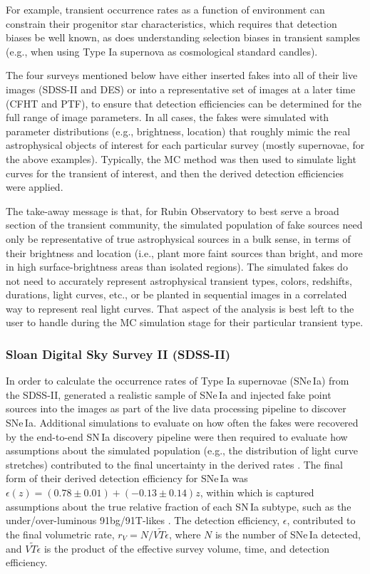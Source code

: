 For example, transient occurrence rates as a function of environment can constrain their progenitor star characteristics, which requires that detection biases be well known, as does understanding selection biases in transient samples (e.g., when using Type Ia supernova as cosmological standard candles). 

The four surveys mentioned below have either inserted fakes into all of their live images (SDSS-II and DES) or into a representative set of images at a later time (CFHT and PTF), to ensure that detection efficiencies can be determined for the full range of image parameters.
In all cases, the fakes were simulated with parameter distributions (e.g., brightness, location) that roughly mimic the real astrophysical objects of interest for each particular survey (mostly supernovae, for the above examples).
Typically, the MC method was then used to simulate light curves for the transient of interest, and then the derived detection efficiencies were applied.

The take-away message is that, for Rubin Observatory to best serve a broad section of the transient community, the simulated population of fake sources need only be representative of true astrophysical sources in a bulk sense, in terms of their brightness and location (i.e., plant more faint sources than bright, and more in high surface-brightness areas than isolated regions).
The simulated fakes do not need to accurately represent astrophysical transient types, colors, redshifts, durations, light curves, etc., or be planted in sequential images in a correlated way to represent real light curves.
That aspect of the analysis is best left to the user to handle during the MC simulation stage for their particular transient type. 

\subsubsection{Sloan Digital Sky Survey II (SDSS-II)}

In order to calculate the occurrence rates of Type Ia supernovae (SNe\,Ia) from the SDSS-II, \cite{2008AJ....135..348S} generated a realistic sample of SNe\,Ia and injected fake point sources into the images as part of the live data processing pipeline to discover SNe\,Ia.
Additional simulations to evaluate on how often the fakes were recovered by the end-to-end SN\,Ia discovery pipeline were then required to evaluate how assumptions about the simulated population (e.g., the distribution of light curve stretches) contributed to the final uncertainty in the derived rates \citep{2008ApJ...682..262D}.
The final form of their derived detection efficiency for SNe\,Ia was $\epsilon(z) = (0.78 \pm 0.01) + (-0.13 \pm 0.14)z$, within which is captured assumptions about the true relative fraction of each SN\,Ia subtype, such as the under/over-luminous 91bg/91T-likes \citep{2008ApJ...682..262D}.
The detection efficiency, $\epsilon$, contributed to the final volumetric rate, $r_V = N / \widetilde{VT\epsilon}$, where $N$ is the number of SNe\,Ia detected, and $\widetilde{VT\epsilon}$ is the product of the effective survey volume, time, and detection efficiency.

